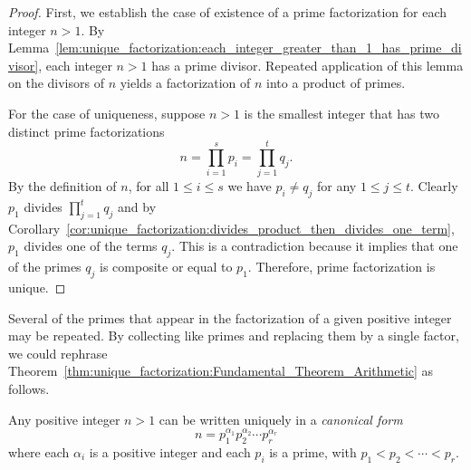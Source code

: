 \begin{proof}
First, we establish the case of existence of a prime factorization for
each integer $n > 1$. By
Lemma~\ref{lem:unique_factorization:each_integer_greater_than_1_has_prime_divisor},
each integer $n > 1$ has a prime divisor. Repeated application of this
lemma on the divisors of $n$ yields a factorization of $n$ into a
product of primes.

For the case of uniqueness, suppose $n > 1$ is the smallest integer
that has two distinct prime factorizations
\[
n
=
\prod_{i=1}^s p_i
=
\prod_{j=1}^t q_j.
\]
By the definition of $n$, for all $1 \leq i \leq s$ we have
$p_i \neq q_j$ for any $1 \leq j \leq t$. Clearly $p_1$ divides
$\prod_{j=1}^t q_j$ and by
Corollary~\ref{cor:unique_factorization:divides_product_then_divides_one_term},
$p_1$ divides one of the terms $q_j$. This is a contradiction because
it implies that one of the primes $q_j$ is composite or equal to
$p_1$. Therefore, prime factorization is unique.
\end{proof}

Several of the primes that appear in the factorization of a given
positive integer may be repeated. By collecting like primes and
replacing them by a single factor, we could rephrase
Theorem~\ref{thm:unique_factorization:Fundamental_Theorem_Arithmetic}
as follows.

\begin{corollary}
Any positive integer $n > 1$ can be written uniquely in a
\emph{canonical form}
\[
n
=
p_1^{\alpha_1} p_2^{\alpha_2} \cdots p_r^{\alpha_r}
\]
where each $\alpha_i$ is a positive integer and each $p_i$ is a prime,
with $p_1 < p_2 < \cdots < p_r$.
\end{corollary}
